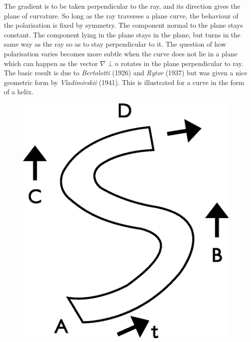 The gradient is to be taken perpendicular to the ray, and its direction gives
the plane of curvature. So long as the ray traverses a plane curve, the behaviour
of the polarisation is fixed by symmetry. The component normal to the plane
stays constant. The component lying in the plane stays in the plane, but
turns in the same way as the ray so as to stay perpendicular to it. The question
of how polarisation varies becomes more subtle when the curve does not lie in
a plane which can happen as the vector $\nabla \perp n $ rotates in the plane perpendicular
to ray. The basic result is due to \textit{Bertolotti} (1926) and \textit{Rytor} (1937) but was
given a nice geometric form by \textit{Vladimirskii} (1941). This is illustrated for a curve in
the form of a helix.
\begin{figure}[H]
\centering
\includegraphics[scale=0.12]{src/images/chap26/20.jpg}
\end{figure}

